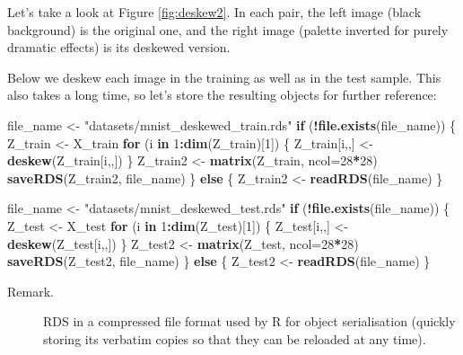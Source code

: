 \documentclass[10pt,b5paper,krantz1]{krantz}
\newenvironment{Shaded}{\begin{snugshade}}{\end{snugshade}}
\newcommand{\ControlFlowTok}[1]{\textcolor[rgb]{0.27,0.27,0.27}{\textbf{#1}}}
\newcommand{\DataTypeTok}[1]{\textcolor[rgb]{0.27,0.27,0.27}{#1}}
\newcommand{\DecValTok}[1]{\textcolor[rgb]{0.06,0.06,0.06}{#1}}
\newcommand{\KeywordTok}[1]{\textcolor[rgb]{0.27,0.27,0.27}{\textbf{#1}}}
\newcommand{\NormalTok}[1]{#1}
\newcommand{\OperatorTok}[1]{\textcolor[rgb]{0.43,0.43,0.43}{\textbf{#1}}}
\newcommand{\StringTok}[1]{\textcolor[rgb]{0.5,0.5,0.5}{#1}}
\begin{document}
Let's take a look at Figure \ref{fig:deskew2}.
In each pair, the left image (black background) is the original one,
and the right image (palette inverted for purely dramatic effects)
is its deskewed version.

Below we deskew each image in the training as well as in the test sample.
This also takes a long time, so let's store the resulting objects
for further reference:

\begin{Shaded}
\begin{Highlighting}[]
\NormalTok{file_name <-}\StringTok{ "datasets/mnist_deskewed_train.rds"}
\ControlFlowTok{if}\NormalTok{ (}\OperatorTok{!}\KeywordTok{file.exists}\NormalTok{(file_name)) \{}
\NormalTok{    Z_train <-}\StringTok{ }\NormalTok{X_train}
    \ControlFlowTok{for}\NormalTok{ (i }\ControlFlowTok{in} \DecValTok{1}\OperatorTok{:}\KeywordTok{dim}\NormalTok{(Z_train)[}\DecValTok{1}\NormalTok{]) \{}
\NormalTok{        Z_train[i,,] <-}\StringTok{ }\KeywordTok{deskew}\NormalTok{(Z_train[i,,])}
\NormalTok{    \}}
\NormalTok{    Z_train2 <-}\StringTok{ }\KeywordTok{matrix}\NormalTok{(Z_train, }\DataTypeTok{ncol=}\DecValTok{28}\OperatorTok{*}\DecValTok{28}\NormalTok{)}
    \KeywordTok{saveRDS}\NormalTok{(Z_train2, file_name)}
\NormalTok{\} }\ControlFlowTok{else}\NormalTok{ \{}
\NormalTok{    Z_train2 <-}\StringTok{ }\KeywordTok{readRDS}\NormalTok{(file_name)}
\NormalTok{\}}

\NormalTok{file_name <-}\StringTok{ "datasets/mnist_deskewed_test.rds"}
\ControlFlowTok{if}\NormalTok{ (}\OperatorTok{!}\KeywordTok{file.exists}\NormalTok{(file_name)) \{}
\NormalTok{    Z_test <-}\StringTok{ }\NormalTok{X_test}
    \ControlFlowTok{for}\NormalTok{ (i }\ControlFlowTok{in} \DecValTok{1}\OperatorTok{:}\KeywordTok{dim}\NormalTok{(Z_test)[}\DecValTok{1}\NormalTok{]) \{}
\NormalTok{        Z_test[i,,] <-}\StringTok{ }\KeywordTok{deskew}\NormalTok{(Z_test[i,,])}
\NormalTok{    \}}
\NormalTok{    Z_test2 <-}\StringTok{ }\KeywordTok{matrix}\NormalTok{(Z_test, }\DataTypeTok{ncol=}\DecValTok{28}\OperatorTok{*}\DecValTok{28}\NormalTok{)}
    \KeywordTok{saveRDS}\NormalTok{(Z_test2, file_name)}
\NormalTok{\} }\ControlFlowTok{else}\NormalTok{ \{}
\NormalTok{    Z_test2 <-}\StringTok{ }\KeywordTok{readRDS}\NormalTok{(file_name)}
\NormalTok{\}}
\end{Highlighting}
\end{Shaded}

\begin{description}
\item[Remark.]
RDS in a compressed file format used by R for object serialisation
(quickly storing its verbatim copies so that they can be reloaded
at any time).
\end{description}
\end{document}
